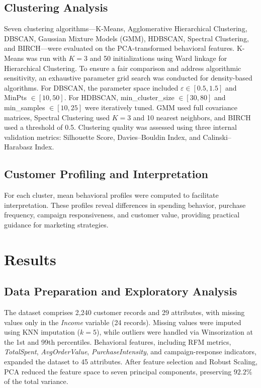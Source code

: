 \documentclass[twoside]{article}
\begin{document}
\subsection{Clustering Analysis}
Seven clustering algorithms—K-Means, Agglomerative Hierarchical Clustering, DBSCAN, Gaussian Mixture Models (GMM), HDBSCAN, Spectral Clustering, and BIRCH—were evaluated on the PCA-transformed behavioral features. K-Means was run with $K=3$ and 50 initializations using Ward linkage for Hierarchical Clustering. To ensure a fair comparison and address algorithmic sensitivity, an exhaustive parameter grid search was conducted for density-based algorithms. For DBSCAN, the parameter space included $\varepsilon \in [0.5, 1.5]$ and MinPts $\in [10, 50]$. For HDBSCAN, min\_cluster\_size $\in [30, 80]$ and min\_samples $\in [10, 25]$ were iteratively tuned. GMM used full covariance matrices, Spectral Clustering used $K=3$ and 10 nearest neighbors, and BIRCH used a threshold of 0.5. Clustering quality was assessed using three internal validation metrics: Silhouette Score, Davies--Bouldin Index, and Calinski--Harabasz Index.

\subsection{Customer Profiling and Interpretation}

For each cluster, mean behavioral profiles were computed to facilitate interpretation. These profiles reveal differences in spending behavior, purchase frequency, campaign responsiveness, and customer value, providing practical guidance for marketing strategies.


\section{Results}
\label{sec:results}
\subsection{Data Preparation and Exploratory Analysis}

The dataset comprises 2,240 customer records and 29 attributes, with missing values only in the \textit{Income} variable (24 records). Missing values were imputed using KNN imputation (\(k=5\)), while outliers were handled via Winsorization at the 1st and 99th percentiles. Behavioral features, including RFM metrics, \textit{TotalSpent}, \textit{AvgOrderValue}, \textit{PurchaseIntensity}, and campaign-response indicators, expanded the dataset to 45 attributes. After feature selection and Robust Scaling, PCA reduced the feature space to seven principal components, preserving \(92.2\%\) of the total variance.
\end{document}
